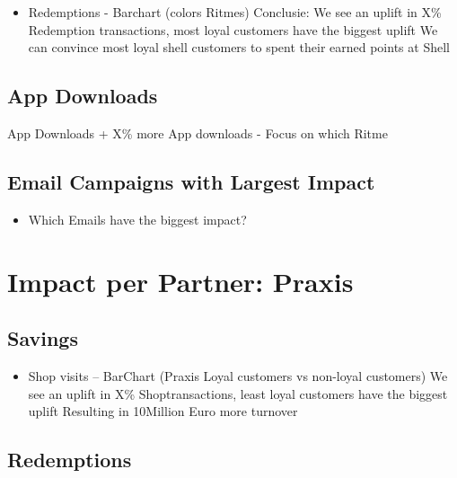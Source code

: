 \documentclass[
  10pt,
]{article}
\providecommand{\tightlist}{%
  \setlength{\itemsep}{0pt}\setlength{\parskip}{0pt}}
\begin{document}
\begin{itemize}
\tightlist
\item
  Redemptions - Barchart (colors Ritmes) Conclusie: We see an uplift in
  X\% Redemption transactions, most loyal customers have the biggest
  uplift We can convince most loyal shell customers to spent their
  earned points at Shell
\end{itemize}

\hypertarget{app-downloads}{%
\subsection{App Downloads}\label{app-downloads}}

App Downloads + X\% more App downloads - Focus on which Ritme

\hypertarget{email-campaigns-with-largest-impact}{%
\subsection{Email Campaigns with Largest
Impact}\label{email-campaigns-with-largest-impact}}

\begin{itemize}
\tightlist
\item
  Which Emails have the biggest impact?
\end{itemize}

\hypertarget{impact-per-partner-praxis}{%
\section{Impact per Partner: Praxis}\label{impact-per-partner-praxis}}

\hypertarget{savings-1}{%
\subsection{Savings}\label{savings-1}}

\begin{itemize}
\tightlist
\item
  Shop visits -- BarChart (Praxis Loyal customers vs non-loyal
  customers) We see an uplift in X\% Shoptransactions, least loyal
  customers have the biggest uplift Resulting in 10Million Euro more
  turnover
\end{itemize}

\hypertarget{redemptions-1}{%
\subsection{Redemptions}\label{redemptions-1}}
\end{document}
